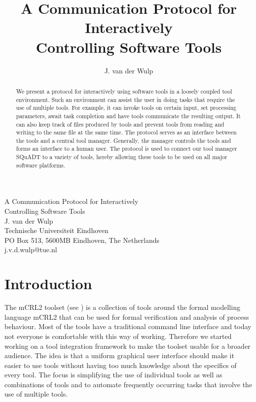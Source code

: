\documentclass{article}
\title{A Communication Protocol for Interactively \\ Controlling Software Tools}
\author{J. van der Wulp}
\date{}
\newcommand{\squadt}{SQuADT\xspace}
\begin{document}
\begin{center}
\Large{A Communication Protocol for Interactively \\
           Controlling Software Tools } \\[8pt]
\large{J. van der Wulp} \\[4pt]
\normalsize{Technische Universiteit Eindhoven} \\
\normalsize{PO Box 513, 5600MB Eindhoven, The Netherlands} \\
\normalsize{j.v.d.wulp@tue.nl} \\[18pt]
\end{center}
\begin{abstract} \noindent %
 We present a protocol for interactively using software tools in a loosely
 coupled tool environment. Such an environment can assist the user in doing
 tasks that require the use of multiple tools. For example, it can invoke tools
 on certain input, set processing parameters, await task completion and have
 tools communicate the resulting output. It can also keep track of files
 produced by tools and prevent tools from reading and writing to the same file
 at the same time.  The protocol serves as an interface between the tools and a
 central tool manager. Generally, the manager controls the tools and forms an
 interface to a human user.  The protocol is used to connect our tool manager
 \squadt to a variety of tools, hereby allowing these tools to be used on all
 major software platforms.
\end{abstract}

\thispagestyle{empty}
\enlargethispage*{20pt}

 \section{Introduction}

  The mCRL2 toolset (see \cite{groote_et_al:DSP:2007:862}) is a collection of
  tools around the formal modelling language mCRL2 that can be used for formal
  verification and analysis of process behaviour.  Most of the tools have a
  traditional command line interface and today not everyone is comfortable with
  this way of working.  Therefore we started working on a tool integration
  framework to make the toolset usable for a broader audience. The idea is that
  a uniform graphical user interface should make it easier to use tools without
  having too much knowledge about the specifics of every tool.  The focus is
  simplifying the use of individual tools as well as combinations of tools and
  to automate frequently occurring tasks that involve the use of multiple
  tools.
  
\end{document}
